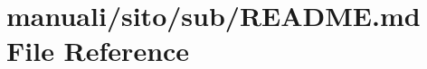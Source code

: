 \hypertarget{manuali_2sito_2sub_2README_8md}{}\section{manuali/sito/sub/\+R\+E\+A\+D\+ME.md File Reference}
\label{manuali_2sito_2sub_2README_8md}
